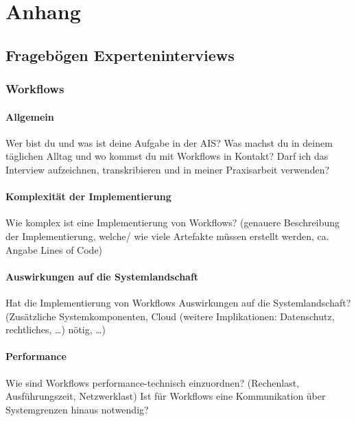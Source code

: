 \chapter{Anhang}

\section*{Fragebögen Experteninterviews}

\subsection*{Workflows} \label{FB_Workflows}

\subsubsection{Allgemein}

Wer bist du und was ist deine Aufgabe in der AIS? Was machst du in deinem täglichen Alltag und wo kommst du mit Workflows in Kontakt?
Darf ich das Interview aufzeichnen, transkribieren und in meiner Praxisarbeit verwenden?

\subsubsection{Komplexität der Implementierung}

Wie komplex ist eine Implementierung von Workflows? (genauere Beschreibung der Implementierung, welche/ wie viele Artefakte müssen erstellt werden, ca. Angabe Lines of Code)

\subsubsection{Auswirkungen auf die Systemlandschaft}

Hat die Implementierung von Workflows Auswirkungen auf die Systemlandschaft? (Zusätzliche Systemkomponenten, Cloud (weitere Implikationen: Datenschutz, rechtliches, …) nötig, …)

\subsubsection{Performance}

Wie sind Workflows performance-technisch einzuordnen? (Rechenlast, Ausführungszeit, Netzwerklast) \newline
Ist für Workflows eine Kommunikation über Systemgrenzen hinaus notwendig?

